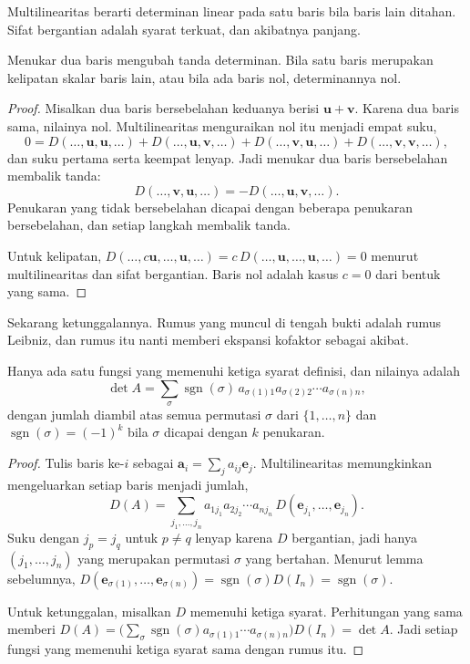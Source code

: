 Multilinearitas berarti determinan linear pada satu baris bila baris lain ditahan. Sifat
bergantian adalah syarat terkuat, dan akibatnya panjang.

\begin{lemma}
Menukar dua baris mengubah tanda determinan. Bila satu baris merupakan kelipatan skalar baris
lain, atau bila ada baris nol, determinannya nol.
\end{lemma}

\begin{proof}
Misalkan dua baris bersebelahan keduanya berisi $\mathbf{u}+\mathbf{v}$. Karena dua baris
sama, nilainya nol. Multilinearitas menguraikan nol itu menjadi empat suku,
\[
  0=D(\dots,\mathbf{u},\mathbf{u},\dots)+D(\dots,\mathbf{u},\mathbf{v},\dots)
   +D(\dots,\mathbf{v},\mathbf{u},\dots)+D(\dots,\mathbf{v},\mathbf{v},\dots),
\]
dan suku pertama serta keempat lenyap. Jadi menukar dua baris bersebelahan membalik tanda:
\[
  D(\dots,\mathbf{v},\mathbf{u},\dots)=-D(\dots,\mathbf{u},\mathbf{v},\dots).
\]
Penukaran yang tidak bersebelahan dicapai dengan beberapa penukaran bersebelahan, dan setiap
langkah membalik tanda.

Untuk kelipatan, $D(\dots,c\mathbf{u},\dots,\mathbf{u},\dots)
=c\,D(\dots,\mathbf{u},\dots,\mathbf{u},\dots)=0$ menurut multilinearitas dan sifat
bergantian. Baris nol adalah kasus $c=0$ dari bentuk yang sama.
\end{proof}

Sekarang ketunggalannya. Rumus yang muncul di tengah bukti adalah rumus Leibniz, dan rumus
itu nanti memberi ekspansi kofaktor sebagai akibat.

\begin{teorema}
Hanya ada satu fungsi yang memenuhi ketiga syarat definisi, dan nilainya adalah
\[
  \det A=\sum_{\sigma}\operatorname{sgn}(\sigma)\,
  a_{\sigma(1)1}a_{\sigma(2)2}\cdots a_{\sigma(n)n},
\]
dengan jumlah diambil atas semua permutasi $\sigma$ dari $\{1,\dots,n\}$ dan
$\operatorname{sgn}(\sigma)=(-1)^{k}$ bila $\sigma$ dicapai dengan $k$ penukaran.
\end{teorema}

\begin{proof}
Tulis baris ke-$i$ sebagai $\mathbf{a}_{i}=\sum_{j}a_{ij}\mathbf{e}_{j}$. Multilinearitas
memungkinkan mengeluarkan setiap baris menjadi jumlah,
\[
  D(A)=\sum_{j_{1},\dots,j_{n}}a_{1j_{1}}a_{2j_{2}}\cdots a_{nj_{n}}\,
  D(\mathbf{e}_{j_{1}},\dots,\mathbf{e}_{j_{n}}).
\]
Suku dengan $j_{p}=j_{q}$ untuk $p\neq q$ lenyap karena $D$ bergantian, jadi hanya
$(j_{1},\dots,j_{n})$ yang merupakan permutasi $\sigma$ yang bertahan. Menurut lemma
sebelumnya, $D(\mathbf{e}_{\sigma(1)},\dots,\mathbf{e}_{\sigma(n)})
=\operatorname{sgn}(\sigma)D(I_{n})=\operatorname{sgn}(\sigma)$.

Untuk ketunggalan, misalkan $D$ memenuhi ketiga syarat. Perhitungan yang sama memberi
$D(A)=\bigl(\sum_{\sigma}\operatorname{sgn}(\sigma)a_{\sigma(1)1}\cdots
a_{\sigma(n)n}\bigr)D(I_{n})=\det A$. Jadi setiap fungsi yang memenuhi ketiga syarat sama
dengan rumus itu.
\end{proof}

